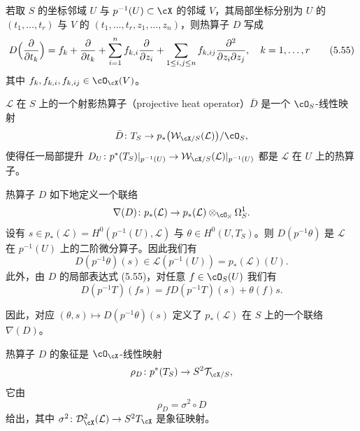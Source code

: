 若取 $S$ 的坐标邻域 $U$ 与 $p^{-1}(U)\subset\cX$ 的邻域 $V$，其局部坐标分别为 $U$ 的 $(t_1,\dots,t_r)$ 与 $V$ 的 $(t_1,\dots,t_r,z_1,\dots,z_n)$，则热算子 $D$ 写成
\begin{equation}
 D\Bigl(\frac{\partial}{\partial t_k}\Bigr)=f_k+\frac{\partial}{\partial t_k}+\sum_{i=1}^n f_{k,i}\frac{\partial}{\partial z_i}+\sum_{1\le i,j\le n}f_{k,ij}\frac{\partial^2}{\partial z_i\partial z_j},\quad k=1,\dots,r \tag{5.55}
\end{equation}
其中 $f_k,f_{k,i},f_{k,ij}\in\cO_{\cX}(V)$。


$\mathcal L$ 在 $S$ 上的一个射影热算子（projective heat operator）$\bar D$ 是一个 $\cO_S$-线性映射
\[
 \bar D\colon T_S\to p_*\bigl(\mathcal W_{\cX/S}(\mathcal L)\bigr)/\cO_S,
\]
使得任一局部提升 $D_U\colon p^*(T_S)|_{p^{-1}(U)}\to\mathcal W_{\cX/S}(\mathcal L)|_{p^{-1}(U)}$ 都是 $\mathcal L$ 在 $U$ 上的热算子。

热算子 $D$ 如下地定义一个联络
\[
 \nabla(D)\colon p_*(\mathcal L)\to p_*(\mathcal L)\otimes_{\cO_S}\Omega^1_S.
\]
设有 $s\in p_*(\mathcal L)=H^0(p^{-1}(U),\mathcal L)$ 与 $\theta\in H^0(U,T_S)$。则 $D(p^{-1}\theta)$ 是 $\mathcal L$ 在 $p^{-1}(U)$ 上的二阶微分算子。因此我们有
\[
 D(p^{-1}\theta)(s)\in\mathcal L(p^{-1}(U))=p_*(\mathcal L)(U).
\]
此外，由 $D$ 的局部表达式 (5.55)，对任意 $f\in\cO_S(U)$ 我们有
\[
 D(p^{-1}T)(fs)=fD(p^{-1}T)(s)+\theta(f)s.
\]


因此，对应 $(\theta,s)\mapsto D(p^{-1}\theta)(s)$ 定义了 $p_*(\mathcal L)$ 在 $S$ 上的一个联络 $\nabla(D)$。

热算子 $D$ 的象征是 $\cO_{\cX}$-线性映射
\[
 \rho_D\colon p^*(T_S)\to S^2\mathcal T_{\cX/S},
\]
它由
\[
 \rho_D=\sigma^2\circ D
\]
给出，其中 $\sigma^2\colon\mathcal D_{\cX}^2(\mathcal L)\to S^2T_{\cX}$ 是象征映射。

